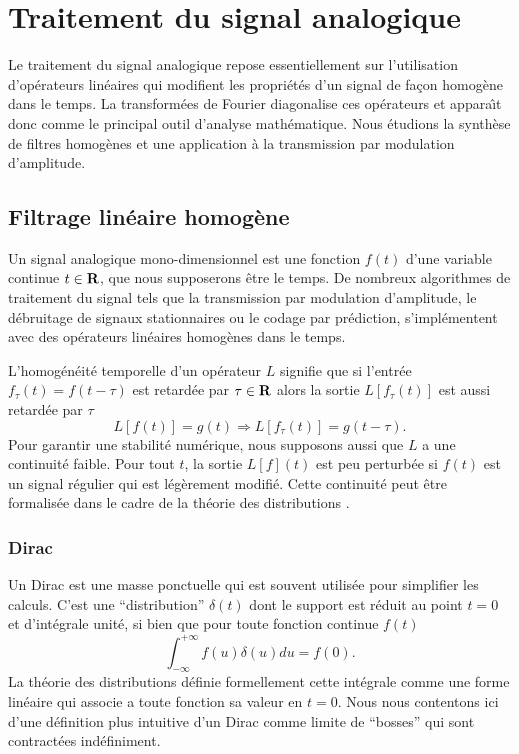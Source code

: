 \chapter{Traitement du signal analogique}
\label{analogique-chap}


Le traitement du signal analogique repose essentiellement sur 
l'utilisation d'op\'erateurs lin\'eaires qui modifient les 
propri\'et\'es d'un signal de fa\c{c}on homog\`ene dans le
temps. La transform\'ees de Fourier 
diagonalise ces op\'erateurs et appara\^{\i}t donc comme
le principal outil d'analyse math\'ematique.
Nous \'etudions la synth\`ese de filtres homog\`enes et une
application \`a la transmission par modulation d'amplitude.

\section{Filtrage lin\'eaire homog\`ene}

Un signal analogique mono-dimensionnel
est une fonction $f(t)$
d'une variable continue $t \in {\bf{R}}$, 
que nous supposerons \^etre le temps. 
De nombreux algorithmes de traitement du signal tels
que la transmission par modulation d'amplitude, le d\'ebruitage
de signaux stationnaires ou le codage par pr\'ediction,
s'impl\'ementent avec des op\'erateurs lin\'eaires homog\`enes dans le
temps. 

L'homog\'en\'eit\'e temporelle d'un op\'erateur $L$ signifie que
si l'entr\'ee $f_\tau (t) = f(t-\tau)$ est retard\'ee
par $\tau \in {\bf{R}}$ alors la sortie $L[f_\tau (t)]$
est aussi retard\'ee par $\tau$
\begin{equation}
\label{invariant}
L[f(t)] = g(t) 
\Rightarrow L [ f_\tau (t) ]= g(t-\tau) . 
\end{equation}
Pour garantir une stabilit\'e num\'erique, nous supposons aussi
que $L$ a une continuit\'e faible.
Pour tout $t$, la sortie
$L[f] (t)$ est peu perturb\'ee si
$f(t)$ est un signal r\'egulier qui est l\'eg\`erement modifi\'e.
Cette continuit\'e peut \^etre formalis\'ee dans le cadre de la th\'eorie
des distributions \cite{bony2}.

\subsection{Dirac}

Un Dirac est une masse ponctuelle qui est souvent utilis\'ee pour
simplifier les calculs. C'est une ``distribution'' $\delta (t)$
dont le support est r\'eduit au point $t = 0$ et d'int\'egrale unit\'e,
si bien que pour toute fonction continue $f(t)$
\[
\int_{-\infty}^{+\infty} f (u) \delta (u) du = f(0).
\]
La th\'eorie des distributions \cite{bony2} d\'efinie formellement
cette int\'egrale
comme une forme lin\'eaire qui associe a toute 
fonction sa valeur en $t = 0$.
Nous nous contentons ici
d'une d\'efinition plus intuitive d'un Dirac
comme limite de ``bosses'' qui sont contract\'ees ind\'efiniment.

